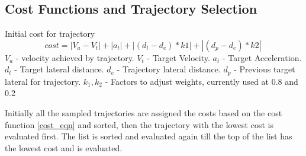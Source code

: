 





\subsection{Cost Functions and Trajectory Selection} \label{traj_Selection}

Initial cost for trajectory
\begin{equation}
cost = |V_a - V_t| + |a_t| + | (d_t - d_e)*k1 | + | (d_p - d_e)*k2 |\
\label{cost_eqn}
\end{equation}
$V_a$ - velocity achieved by trajectory.
$V_t$ - Target Velocity.
$a_t$ - Target Acceleration.
$d_t$ - Target lateral distance.
$d_e$ - Trajectory lateral distance.
$d_p$ - Previous target lateral for trajectory.
$k_1,k_2$ - Factors to adjust weights, currently used at 0.8 and 0.2


Initially all the sampled trajectories are assigned the costs based on the cost function \ref{cost_eqn} and sorted, then the trajectory with the lowest cost is evaluated first. The list is sorted and evaluated again till the top of the list has the lowest cost and is evaluated.

